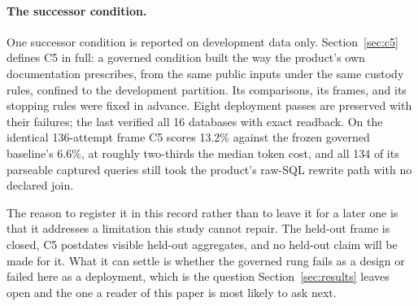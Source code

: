 \paragraph{The successor condition.}
One successor condition is reported on development data only.
Section~\ref{sec:c5} defines C5 in full: a governed condition built the way the
product's own documentation prescribes, from the same public inputs under the same
custody rules, confined to the development partition. Its comparisons, its frames,
and its stopping rules were fixed in advance. Eight deployment passes are
preserved with their failures; the last verified all 16 databases with exact
readback. On the identical 136-attempt frame C5 scores 13.2\% against the frozen
governed baseline's 6.6\%, at roughly two-thirds the median token cost, and all
134 of its parseable captured queries still took the product's raw-SQL rewrite
path with no declared join.

The reason to register it in this record rather than to leave it for a later one
is that it addresses a limitation this study cannot repair. The held-out frame is
closed, C5 postdates visible held-out aggregates, and no held-out claim will be
made for it. What it can settle is whether the governed rung fails as a design or
failed here as a deployment, which is the question Section~\ref{sec:results}
leaves open and the one a reader of this paper is most likely to ask next.
